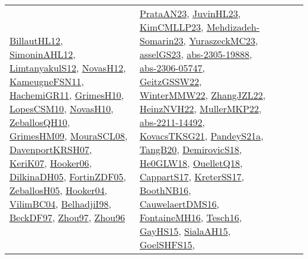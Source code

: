 {\begin{longtable}{llp{6cm}p{6cm}p{6cm}}
\href{papers/BillautHL12.pdf}{BillautHL12}\cite{BillautHL12}, \href{papers/SimoninAHL12.pdf}{SimoninAHL12}\cite{SimoninAHL12}, \href{articles/LimtanyakulS12.pdf}{LimtanyakulS12}\cite{LimtanyakulS12}, \href{articles/NovasH12.pdf}{NovasH12}\cite{NovasH12}, \href{papers/KameugneFSN11.pdf}{KameugneFSN11}\cite{KameugneFSN11}, \href{articles/HachemiGR11.pdf}{HachemiGR11}\cite{HachemiGR11}, \href{papers/GrimesH10.pdf}{GrimesH10}\cite{GrimesH10}, \href{articles/LopesCSM10.pdf}{LopesCSM10}\cite{LopesCSM10}, \href{articles/NovasH10.pdf}{NovasH10}\cite{NovasH10}, \href{articles/ZeballosQH10.pdf}{ZeballosQH10}\cite{ZeballosQH10}, \href{papers/GrimesHM09.pdf}{GrimesHM09}\cite{GrimesHM09}, \href{papers/MouraSCL08.pdf}{MouraSCL08}\cite{MouraSCL08}, \href{papers/DavenportKRSH07.pdf}{DavenportKRSH07}\cite{DavenportKRSH07}, \href{papers/KeriK07.pdf}{KeriK07}\cite{KeriK07}, \href{articles/Hooker06.pdf}{Hooker06}\cite{Hooker06}, \href{papers/DilkinaDH05.pdf}{DilkinaDH05}\cite{DilkinaDH05}, \href{papers/FortinZDF05.pdf}{FortinZDF05}\cite{FortinZDF05}, \href{articles/ZeballosH05.pdf}{ZeballosH05}\cite{ZeballosH05}, \href{papers/Hooker04.pdf}{Hooker04}\cite{Hooker04}, \href{papers/VilimBC04.pdf}{VilimBC04}\cite{VilimBC04}, \href{articles/BelhadjiI98.pdf}{BelhadjiI98}\cite{BelhadjiI98}, \href{papers/BeckDF97.pdf}{BeckDF97}\cite{BeckDF97}, \href{articles/Zhou97.pdf}{Zhou97}\cite{Zhou97}, \href{papers/Zhou96.pdf}{Zhou96}\cite{Zhou96} & \href{articles/PrataAN23.pdf}{PrataAN23}\cite{PrataAN23}, \href{papers/JuvinHL23.pdf}{JuvinHL23}\cite{JuvinHL23}, \href{papers/KimCMLLP23.pdf}{KimCMLLP23}\cite{KimCMLLP23}, \href{papers/Mehdizadeh-Somarin23.pdf}{Mehdizadeh-Somarin23}\cite{Mehdizadeh-Somarin23}, \href{papers/YuraszeckMC23.pdf}{YuraszeckMC23}\cite{YuraszeckMC23}, \href{papers/asselGS23.pdf}{asselGS23}\cite{asselGS23}, \href{articles/abs-2305-19888.pdf}{abs-2305-19888}\cite{abs-2305-19888}, \href{articles/abs-2306-05747.pdf}{abs-2306-05747}\cite{abs-2306-05747}, \href{papers/GeitzGSSW22.pdf}{GeitzGSSW22}\cite{GeitzGSSW22}, \href{papers/WinterMMW22.pdf}{WinterMMW22}\cite{WinterMMW22}, \href{papers/ZhangJZL22.pdf}{ZhangJZL22}\cite{ZhangJZL22}, \href{articles/HeinzNVH22.pdf}{HeinzNVH22}\cite{HeinzNVH22}, \href{articles/MullerMKP22.pdf}{MullerMKP22}\cite{MullerMKP22}, \href{articles/abs-2211-14492.pdf}{abs-2211-14492}\cite{abs-2211-14492}, \href{papers/KovacsTKSG21.pdf}{KovacsTKSG21}\cite{KovacsTKSG21}, \href{articles/PandeyS21a.pdf}{PandeyS21a}\cite{PandeyS21a}, \href{papers/TangB20.pdf}{TangB20}\cite{TangB20}, \href{papers/DemirovicS18.pdf}{DemirovicS18}\cite{DemirovicS18}, \href{papers/He0GLW18.pdf}{He0GLW18}\cite{He0GLW18}, \href{papers/OuelletQ18.pdf}{OuelletQ18}\cite{OuelletQ18}, \href{papers/CappartS17.pdf}{CappartS17}\cite{CappartS17}, \href{articles/KreterSS17.pdf}{KreterSS17}\cite{KreterSS17}, \href{papers/BoothNB16.pdf}{BoothNB16}\cite{BoothNB16}, \href{papers/CauwelaertDMS16.pdf}{CauwelaertDMS16}\cite{CauwelaertDMS16}, \href{papers/FontaineMH16.pdf}{FontaineMH16}\cite{FontaineMH16}, \href{papers/Tesch16.pdf}{Tesch16}\cite{Tesch16}, \href{papers/GayHS15.pdf}{GayHS15}\cite{GayHS15}, \href{papers/SialaAH15.pdf}{SialaAH15}\cite{SialaAH15}, \href{articles/GoelSHFS15.pdf}{GoelSHFS15}\cite{GoelSHFS15}, 
\end{longtable}}
